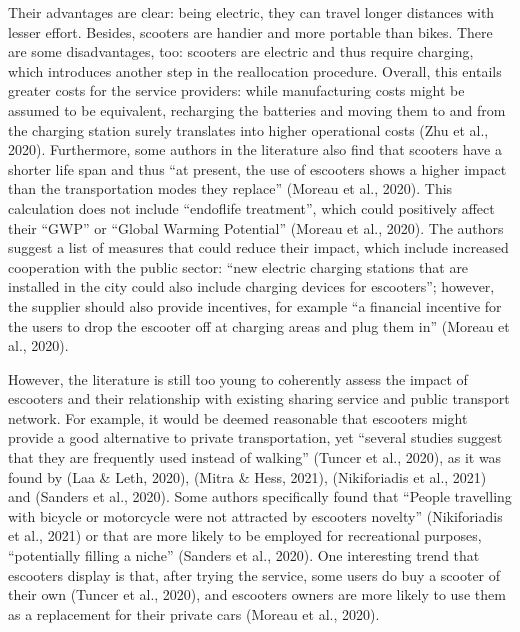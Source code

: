 \documentclass[letterpaper,10pt,english]{jupyterBook}
\begin{document}
\sphinxAtStartPar
Their advantages are clear: being electric, they can travel longer distances with lesser effort. Besides, scooters are handier and more portable than bikes. There are some disadvantages, too: scooters are electric and thus require charging, which introduces another step in the reallocation procedure. Overall, this entails greater costs for the service providers: while manufacturing costs might be assumed to be equivalent, recharging the batteries and moving them to and from the charging station surely translates into higher operational costs (Zhu et al., 2020). Furthermore, some authors in the literature also find that scooters have a shorter life span and thus “at present, the use of e\sphinxhyphen{}scooters shows a higher impact than the transportation modes they replace” (Moreau et al., 2020). This calculation does not include “end\sphinxhyphen{}of\sphinxhyphen{}life treatment”, which could positively affect their “GWP” or “Global Warming Potential” (Moreau et al., 2020). The authors suggest a list of measures that could reduce their impact, which include increased cooperation with the public sector: “new electric charging stations that are installed in the city could also include charging devices for e\sphinxhyphen{}scooters”; however, the supplier should also provide incentives, for example “a financial incentive for the users to drop the e\sphinxhyphen{}scooter off at charging areas and plug them in” (Moreau et al., 2020).

\sphinxAtStartPar
However, the literature is still too young to coherently assess the impact of e\sphinxhyphen{}scooters and their relationship with existing sharing service and public transport network. For example, it would be deemed reasonable that e\sphinxhyphen{}scooters might provide a good alternative to private transportation, yet “several studies suggest that they are frequently used instead of walking” (Tuncer et al., 2020), as it was found by (Laa \& Leth, 2020), (Mitra \& Hess, 2021), (Nikiforiadis et al., 2021) and (Sanders et al., 2020). Some authors specifically found that “People travelling with bicycle or motorcycle were not attracted by e\sphinxhyphen{}scooters novelty” (Nikiforiadis et al., 2021) or that are more likely to be employed for recreational purposes, “potentially filling a niche” (Sanders et al., 2020). One interesting trend that e\sphinxhyphen{}scooters display is that, after trying the service, some users do buy a scooter of their own (Tuncer et al., 2020), and e\sphinxhyphen{}scooters owners are more likely to use them as a replacement for their private cars (Moreau et al., 2020).
\end{document}
